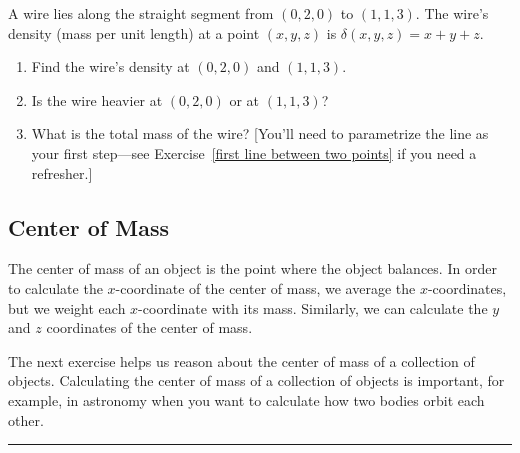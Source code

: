 \begin{problem}%
%
 A wire lies along the straight segment from $(0,2,0)$ to $(1,1,3)$.  The wire's density (mass per unit length) at a point $(x,y,z)$ is $\delta(x,y,z)=x+y+z$. 
\begin{enumerate}
	\item Find the wire's density at $(0,2,0)$ and $(1,1,3)$.
	\item Is the wire heavier at $(0,2,0)$ or at $(1,1,3)$?
	\item  What is the total mass of the wire?  [You'll need to parametrize the line as your first step---see Exercise~\ref{first line between two points} if you need a refresher.]
 \end{enumerate}
\end{problem}

\subsection{Center of Mass}


%
The center of mass of an object is the point where the object balances.  In order to calculate the $x$-coordinate of the center of mass, we average the $x$-coordinates, but we weight each $x$-coordinate with its mass.  Similarly, we can calculate the $y$ and $z$ coordinates of the center of mass.

The next exercise helps us reason about the center of mass of a collection of objects.  Calculating the center of mass of a collection of objects is important, for example, in astronomy when you want to calculate how two bodies orbit each other.

\hrule


